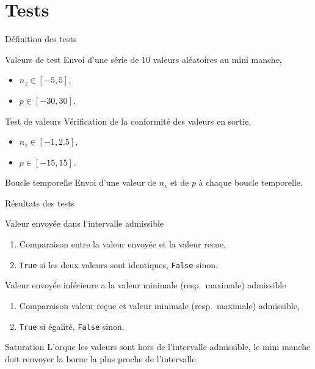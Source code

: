 \documentclass[footheight=2em]{beamer}
\begin{document}
\section{Tests}
\begin{frame}[t]{Définition des tests}
  \begin{block}{Valeurs de test}
    Envoi d'une série de 10 valeurs aléatoires au mini manche,
    \begin{itemize}
      \item \(n_z \in [-5, 5]\),
      \item \(p \in [-30, 30]\).
    \end{itemize}
  \end{block}
  \begin{block}{Test de valeurs}
    Vérification de la conformité des valeurs en sortie,
    \begin{itemize}
      \item \(n_z \in [-1, 2.5]\),
      \item \(p \in [-15, 15]\).
    \end{itemize}
  \end{block}
  \begin{block}{Boucle temporelle}
    Envoi d'une valeur de \(n_z\) et de \(p\) à chaque boucle temporelle.
  \end{block}
\end{frame}

\begin{frame}[t]{Résultats des tests}
  \begin{block}{Valeur envoyée dans l'intervalle admissible}
    \begin{enumerate}
      \item Comparaison entre la valeur envoyée et la valeur recue,
      \item \texttt{True} si les deux valeurs sont identiques, \texttt{False}
        sinon.
    \end{enumerate}
  \end{block}
  \begin{block}{Valeur envoyée inférieure a la valeur minimale (resp.\
      maximale) admissible}
    \begin{enumerate}
      \item Comparaison valeur reçue et valeur minimale (resp.\ maximale)
        admissible,
      \item \texttt{True} si égalité, \texttt{False} sinon.
    \end{enumerate}
  \end{block}
  \begin{block}{Saturation}
    L'orque les valeurs sont hors de l'intervalle admissible, le mini manche doit
    renvoyer la borne la plus proche de l'intervalle.
  \end{block}
\end{frame}
\end{document}
